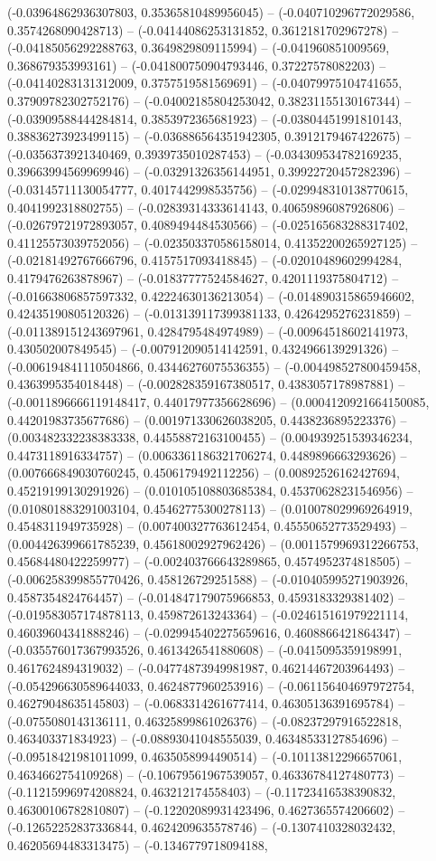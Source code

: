 (-0.03964862936307803, 0.35365810489956045) -- (-0.040710296772029586, 0.3574268090428713) -- (-0.04144086253131852, 0.3612181702967278) -- (-0.04185056292288763, 0.3649829809115994) -- (-0.041960851009569, 0.368679353993161) -- (-0.041800750904793446, 0.37227578082203) -- (-0.04140283131312009, 0.3757519581569691) -- (-0.04079975104741655, 0.37909782302752176) -- (-0.04002185804253042, 0.38231155130167344) -- (-0.03909588444284814, 0.3853972365681923) -- (-0.03804451991810143, 0.38836273923499115) -- (-0.036886564351942305, 0.3912179467422675) -- (-0.0356373921340469, 0.3939735010287453) -- (-0.034309534782169235, 0.39663994569969946) -- (-0.03291326356144951, 0.39922720457282396) -- (-0.03145711130054777, 0.4017442998535756) -- (-0.029948310138770615, 0.4041992318802755) -- (-0.02839314333614143, 0.40659896087926806) -- (-0.02679721972893057, 0.4089494484530566) -- (-0.025165683288317402, 0.41125573039752056) -- (-0.023503370586158014, 0.41352200265927125) -- (-0.02181492767666796, 0.4157517093418845) -- (-0.02010489602994284, 0.4179476263878967) -- (-0.01837777524584627, 0.4201119375804712) -- (-0.01663806857597332, 0.42224630136213054) -- (-0.014890315865946602, 0.42435190805120326) -- (-0.013139117399381133, 0.4264295276231859) -- (-0.011389151243697961, 0.4284795484974989) -- (-0.00964518602141973, 0.430502007849545) -- (-0.007912090514142591, 0.4324966139291326) -- (-0.006194841110504866, 0.43446276075536355) -- (-0.004498527800459458, 0.4363995354018448) -- (-0.002828359167380517, 0.4383057178987881) -- (-0.0011896666119148417, 0.44017977356628696) -- (0.0004120921664150085, 0.44201983735677686) -- (0.001971330626038205, 0.4438236895223376) -- (0.003482332238383338, 0.44558872163100455) -- (0.004939251539346234, 0.4473118916334757) -- (0.0063361186321706274, 0.4489896663293626) -- (0.007666849030760245, 0.4506179492112256) -- (0.00892526162427694, 0.45219199130291926) -- (0.010105108803685384, 0.45370628231546956) -- (0.010801883291003104, 0.45462775300278113) -- (0.010078029969264919, 0.4548311949735928) -- (0.007400327763612454, 0.45550652773529493) -- (0.004426399661785239, 0.45618002927962426) -- (0.0011579969312266753, 0.45684480422259977) -- (-0.002403766643289865, 0.4574952374818505) -- (-0.006258399855770426, 0.458126729251588) -- (-0.010405995271903926, 0.4587354824764457) -- (-0.014847179075966853, 0.4593183329381402) -- (-0.019583057174878113, 0.459872613243364) -- (-0.024615161979221114, 0.46039604341888246) -- (-0.029945402275659616, 0.4608866421864347) -- (-0.035576017367993526, 0.4613426541880608) -- (-0.0415095359198991, 0.4617624894319032) -- (-0.04774873949981987, 0.46214467203964493) -- (-0.054296630589644033, 0.4624877960253916) -- (-0.061156404697972754, 0.46279048635145803) -- (-0.0683314261677414, 0.46305136391695784) -- (-0.0755080143136111, 0.46325899861026376) -- (-0.08237297916522818, 0.463403371834923) -- (-0.08893041048555039, 0.46348533127854696) -- (-0.09518421981011099, 0.4635058994490514) -- (-0.10113812296657061, 0.4634662754109268) -- (-0.10679561967539057, 0.46336784127480773) -- (-0.11215996974208824, 0.463212174558403) -- (-0.11723416538390832, 0.46300106782810807) -- (-0.12202089931423496, 0.4627365574206602) -- (-0.12652252837336844, 0.4624209635578746) -- (-0.1307410328032432, 0.46205694483313475) -- (-0.1346779718094188, 